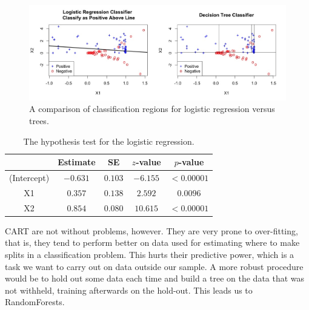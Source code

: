 \documentclass[11pt]{article}
\begin{document}
\begin{figure}[H] \center
\includegraphics[scale=.35]{../Figures/Logit_vs_Tree.jpeg} 
\caption{A comparison of classification regions for logistic regression versus trees.}
\end{figure}

\begin{table}[H] \center
\caption{The hypothesis test for the logistic regression.}
\begin{tabular}{|c|c|c|c|c|} \hline
& Estimate & SE & $z$-value & $p$-value \\ \hline
(Intercept) & $-0.631$ & $0.103$ & $-6.155$ & $<0.00001$ \\ \hline
X1 & $0.357$ & $0.138$ & $2.592$ & $0.0096$ \\ \hline
X2 & $0.854$ & $0.080$ & $10.615$ & $<0.00001$ \\ \hline
\end{tabular}
\end{table}

CART are not without problems, however. They are very prone to over-fitting, that is, they tend to perform better on data used for estimating where to make splits in a classification problem. This hurts their predictive power, which is a task we want to carry out on data outside our sample. A more robust procedure would be to hold out some data each time and build a tree on the data that was not withheld, training afterwards on the hold-out. This leads us to RandomForests.
\end{document}

